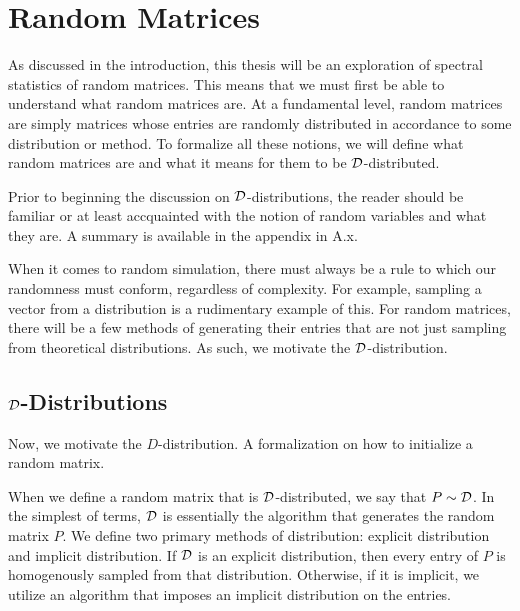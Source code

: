 \chapter{Random Matrices}

As discussed in the introduction, this thesis will be an exploration of spectral statistics of random matrices. This means that we must first be able to understand what random matrices are. At a fundamental level, random matrices are simply matrices whose entries are randomly distributed in accordance to some distribution or method. To formalize all these notions, we will define what random matrices are and what it means for them to be $\D$-distributed.

Prior to beginning the discussion on $\D$-distributions, the reader should be familiar or at least accquainted with the notion of random variables and what they are. A summary is available in the appendix in A.x.

When it comes to random simulation, there must always be a rule to which our randomness must conform, regardless of complexity. For example, sampling a vector from a distribution is a rudimentary example of this. For random matrices, there will be a few methods of generating their entries that are not just sampling from theoretical distributions. As such, we motivate the $\D$-distribution.


\section{$\D$-Distributions}

Now, we motivate the $D$-distribution. A formalization on how to initialize a random matrix.

\begin{definition}[$\D$-distribution]
When we define a random matrix that is $\D$-distributed, we say that $P \sim \mathcal{D}$. In the simplest of terms, $\D$ is essentially the algorithm that generates the random matrix $P$. We define two primary methods of distribution: explicit distribution and implicit distribution. If $\D$ is an explicit distribution, then every entry of $P$ is homogenously sampled from that distribution. Otherwise, if it is implicit, we utilize an algorithm that imposes an implicit distribution on the entries.
\end{definition}

